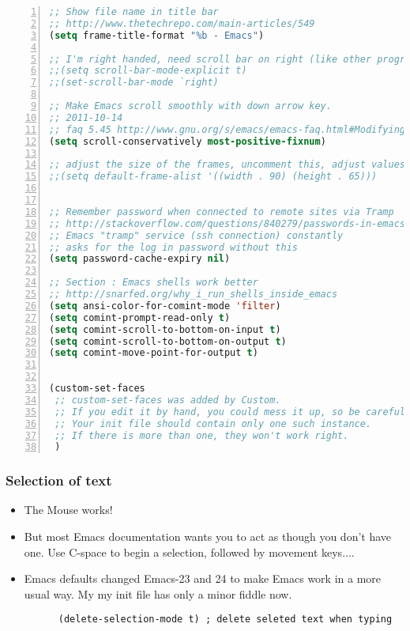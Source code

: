 \documentclass[11pt,english]{beamer}
\begin{document}
\begin{frame}
\begin{lstlisting}[basicstyle={\tiny},language=Lisp,numbers=left,numberstyle={\tiny},tabsize=2]
;; Show file name in title bar
;; http://www.thetechrepo.com/main-articles/549
(setq frame-title-format "%b - Emacs")

;; I'm right handed, need scroll bar on right (like other programs)
;;(setq scroll-bar-mode-explicit t)
;;(set-scroll-bar-mode `right) 

;; Make Emacs scroll smoothly with down arrow key.
;; 2011-10-14
;; faq 5.45 http://www.gnu.org/s/emacs/emacs-faq.html#Modifying-pull_002ddown-menus
(setq scroll-conservatively most-positive-fixnum)

;; adjust the size of the frames, uncomment this, adjust values
;;(setq default-frame-alist '((width . 90) (height . 65)))


;; Remember password when connected to remote sites via Tramp
;; http://stackoverflow.com/questions/840279/passwords-in-emacs-tramp-mode-editing
;; Emacs "tramp" service (ssh connection) constantly
;; asks for the log in password without this
(setq password-cache-expiry nil)

;; Section : Emacs shells work better
;; http://snarfed.org/why_i_run_shells_inside_emacs
(setq ansi-color-for-comint-mode 'filter)
(setq comint-prompt-read-only t)
(setq comint-scroll-to-bottom-on-input t)
(setq comint-scroll-to-bottom-on-output t)
(setq comint-move-point-for-output t)


(custom-set-faces
 ;; custom-set-faces was added by Custom.
 ;; If you edit it by hand, you could mess it up, so be careful.
 ;; Your init file should contain only one such instance.
 ;; If there is more than one, they won't work right.
 )
  \end{lstlisting}


\end{frame}

\begin{frame}
  \frametitle{Selection of text}
  \begin{itemize}
  \item The Mouse works!
  \item But most Emacs documentation wants you to act as though you
    don't have one. Use C-space to begin a selection,
    followed by movement keys$\ldots$.  
  \item Emacs defaults changed Emacs-23 and 24 to make Emacs work in a
    more usual way. My my init file has only a minor fiddle now.

    \begin{lstlisting}
      (delete-selection-mode t) ; delete seleted text when typing
    \end{lstlisting}


  \end{itemize}
\end{frame}
\end{document}
